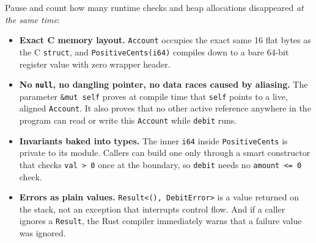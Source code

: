 Pause and count how many runtime checks and heap allocations disappeared \emph{at the same time}:
\begin{itemize}
  \item \textbf{Exact C memory layout.} \texttt{Account} occupies the exact same 16 flat bytes as the C \texttt{struct}, and \texttt{PositiveCents(i64)} compiles down to a bare 64-bit register value with zero wrapper header.
  \item \textbf{No \texttt{null}, no dangling pointer, no data races caused by aliasing.} The parameter \texttt{\&mut self} proves at compile time that \texttt{self} points to a live, aligned \texttt{Account}. It also proves that no other active reference anywhere in the program can read or write this \texttt{Account} while \texttt{debit} runs.
  \item \textbf{Invariants baked into types.} The inner \texttt{i64} inside \texttt{PositiveCents} is private to its module. Callers can build one only through a smart constructor that checks \texttt{val > 0} once at the boundary, so \texttt{debit} needs no \texttt{amount <= 0} check.
  \item \textbf{Errors as plain values.} \texttt{Result<(), DebitError>} is a value returned on the stack, not an exception that interrupts control flow. And if a caller ignores a \texttt{Result}, the Rust compiler immediately warns that a failure value was ignored.
\end{itemize}

